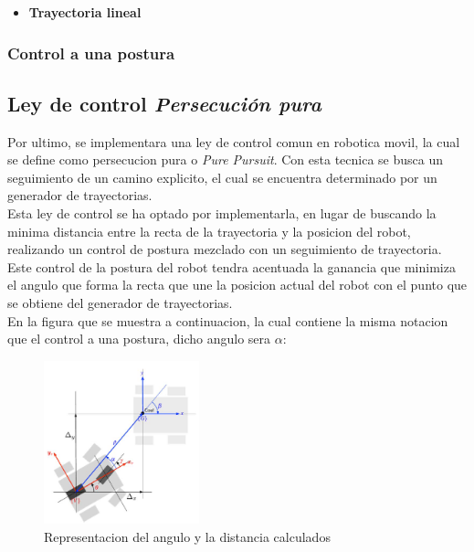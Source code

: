 \documentclass[a4paper,twoside]{article}
\begin{document}
	\begin{itemize}
		\item \textbf{Trayectoria lineal}
		
	\end{itemize}
	
	
	\subsubsection{Control a una postura}

\newpage

\subsection{Ley de control \textit{Persecución pura}}
Por ultimo, se implementara una ley de control comun en robotica movil, la cual se define como persecucion pura o \textit{Pure Pursuit}. Con esta tecnica se busca un seguimiento de un camino explicito, el cual se encuentra determinado por un generador de trayectorias.\\
Esta ley de control se ha optado por implementarla, en lugar de buscando la minima distancia entre la recta de la trayectoria y la posicion del robot, realizando un control de postura mezclado con un seguimiento de trayectoria. \\
Este control de la postura del robot tendra acentuada la ganancia que minimiza el angulo que forma la recta que une la posicion actual del robot con el punto que se obtiene del generador de trayectorias.\\
En la figura que se muestra a continuacion, la cual contiene la misma notacion que el control a una postura, dicho angulo sera $\alpha$:

\begin{figure}[h!]
   \centering
   \includegraphics[width=0.4\textwidth]{postura}
   \caption{Representacion del angulo y la distancia calculados}
\end{figure}
\end{document}
